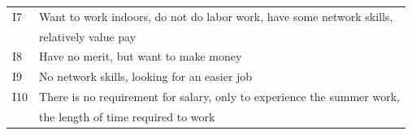 \documentclass[12pt]{article}
\begin{document}
\begin{appendix}
\begin{table}[]
\begin{tabular}{ll}
            I7   & Want to work indoors, do not do   labor work, have some network skills, \\ & relatively value pay                                                                                      \\
            I8   & Have no merit, but want to make   money                                                                                                                                           \\
            I9   & No network skills, looking for an easier job                                                                                                                                    \\
            I10  & There is no requirement for salary, only to experience the summer work, \\ &     the length of time required to   work                                                                  
            \end{tabular}
            \end{table}


\end{appendix}
\end{document}
